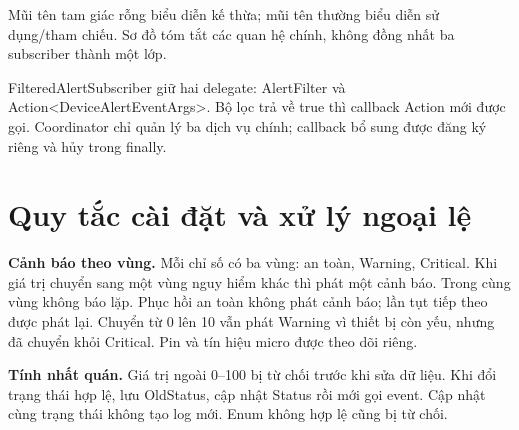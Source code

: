 \documentclass[11pt,a4paper]{article}
\begin{document}
\begin{center}
\end{center}
Mũi tên tam giác rỗng biểu diễn kế thừa; mũi tên thường biểu diễn sử dụng/tham chiếu. Sơ đồ tóm tắt các quan hệ chính, không đồng nhất ba subscriber thành một lớp.

FilteredAlertSubscriber giữ hai delegate: AlertFilter và Action\textless DeviceAlertEventArgs\textgreater. Bộ lọc trả về true thì callback Action mới được gọi. Coordinator chỉ quản lý ba dịch vụ chính; callback bổ sung được đăng ký riêng và hủy trong finally.
\newpage
\section{Quy tắc cài đặt và xử lý ngoại lệ}
\textbf{Cảnh báo theo vùng.} Mỗi chỉ số có ba vùng: an toàn, Warning, Critical. Khi giá trị chuyển sang một vùng nguy hiểm khác thì phát một cảnh báo. Trong cùng vùng không báo lặp. Phục hồi an toàn không phát cảnh báo; lần tụt tiếp theo được phát lại. Chuyển từ 0 lên 10 vẫn phát Warning vì thiết bị còn yếu, nhưng đã chuyển khỏi Critical. Pin và tín hiệu micro được theo dõi riêng.

\textbf{Tính nhất quán.} Giá trị ngoài 0--100 bị từ chối trước khi sửa dữ liệu. Khi đổi trạng thái hợp lệ, lưu OldStatus, cập nhật Status rồi mới gọi event. Cập nhật cùng trạng thái không tạo log mới. Enum không hợp lệ cũng bị từ chối.
\end{document}
